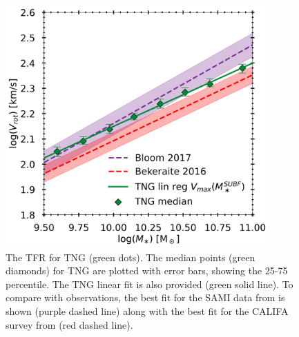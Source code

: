 \begin{figure}
    \centering
    \includegraphics[width=0.9\textwidth]{images/TFR.png}
    \caption{The TFR for TNG (green dots). The median points (green diamonds) for TNG are plotted with error bars, showing the 25-75 percentile. The TNG linear fit is also provided (green solid line). To compare with observations, the best fit for the SAMI data from \textcite{Bloom2017} is shown (purple dashed line) along with the best fit for the CALIFA survey from \textcite{Bekerait2016} (red dashed line).}
    \label{TFR}
\end{figure}


